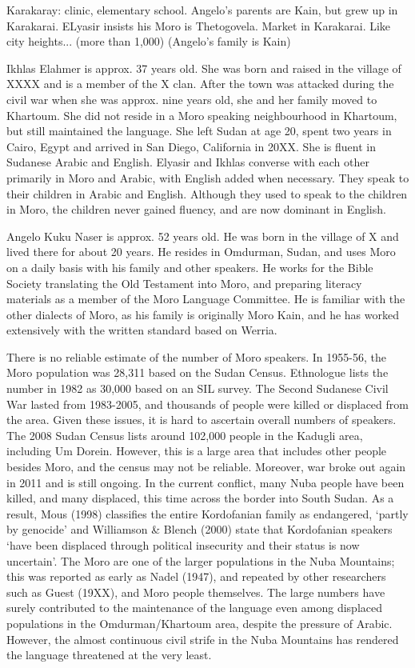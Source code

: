 Karakaray: clinic, elementary school. Angelo's parents are Kain, but grew up in Karakarai. ELyasir insists his Moro is Thetogovela. Market in Karakarai. Like city heights... (more than 1,000) (Angelo's family is Kain)

Ikhlas Elahmer is approx. 37 years old. She was born and raised in the village of XXXX and is a member of the X clan. After the town was attacked during the civil war when she was approx. nine years old, she and her family moved to Khartoum. She did not reside in a Moro speaking neighbourhood in Khartoum, but still maintained the language. She left Sudan at age 20, spent two years in Cairo, Egypt and arrived in San Diego, California in 20XX. She is fluent in Sudanese Arabic and English. Elyasir and Ikhlas converse with each other primarily in Moro and Arabic, with English added when necessary. They speak to their children in Arabic and English. Although they used to speak to the children in Moro, the children never gained fluency, and are now dominant in English. 

Angelo Kuku Naser is approx. 52 years old. He was born in the village of X and lived there for about 20 years. He resides in Omdurman, Sudan, and uses Moro on a daily basis with his family and other speakers. He works for the Bible Society translating the Old Testament into Moro, and preparing literacy materials as a member of the Moro Language Committee. He is familiar with the other dialects of Moro, as his family is originally Moro Kain, and he has worked extensively with the written standard based on Werria.  

There is no reliable estimate of the number of Moro speakers. In 1955-56, the Moro population was 28,311 based on the Sudan Census. Ethnologue lists the number in 1982 as 30,000 based on an SIL survey. The Second Sudanese Civil War lasted from 1983-2005, and thousands of people were killed or displaced from the area. Given these issues, it is hard to ascertain overall numbers of speakers. The 2008 Sudan Census lists around 102,000 people in the Kadugli area, including Um Dorein. However, this is a large area that includes other people besides Moro, and the census may not be reliable. Moreover, war broke out again in 2011 and is still ongoing. In the current conflict, many Nuba people have been killed, and many displaced, this time across the border into South Sudan. As a result, Mous (1998) classifies the entire Kordofanian family as endangered, ‘partly by genocide’ and Williamson \& Blench (2000) state that Kordofanian speakers ‘have been displaced through political insecurity and their status is now uncertain’. The Moro are one of the larger populations in the Nuba Mountains; this was reported as early as Nadel (1947), and repeated by other researchers such as Guest (19XX), and Moro people themselves. The large numbers have surely contributed to the maintenance of the language even among displaced populations in the Omdurman/Khartoum area, despite the pressure of Arabic. However, the almost continuous civil strife in the Nuba Mountains has rendered the language threatened at the very least. 


